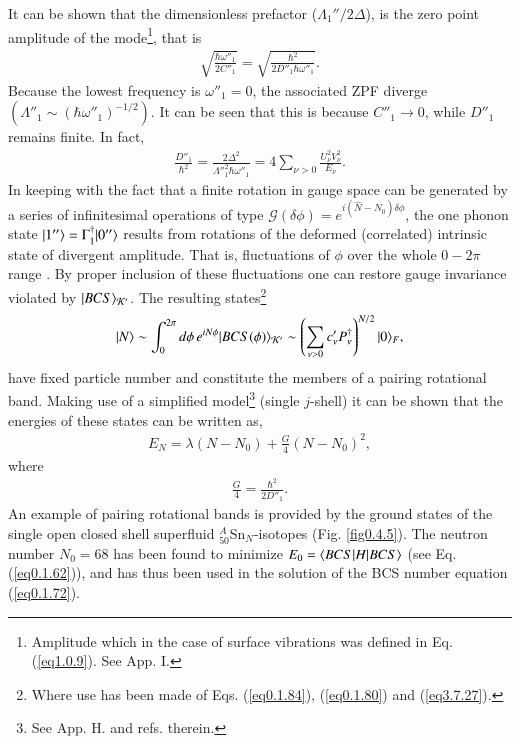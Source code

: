 It can be shown that the dimensionless prefactor ($\Lambda_1''/2\Delta$), is the zero point amplitude of the mode\footnote{Amplitude which in the case of surface vibrations was defined in Eq. (\ref{eq1.0.9}). See \cite{Brink:05} App. I.}, that is 
\begin{align}\label{eq0.1.99}
\sqrt{\frac{\hbar\omega''_1}{2C''_1}}=\sqrt{\frac{\hbar^2}{2D''_1\hbar\omega''_1}}.
\end{align}
Because the lowest frequency is $\omega''_1=0$, the associated ZPF diverge $(\Lambda''_1\sim(\hbar\omega''_1)^{-1/2})$. It can be seen that this is because $C''_1\to0$, while $D''_1$ remains finite. In fact,
\begin{align}\label{eq0.1.100}
\frac{D''_1}{\hbar^2}=\frac{2\Delta^2}{\Lambda''^2_1\hbar\omega''_1}=4\sum_{\nu>0}\frac{U^2_\nu V^2_\nu}{E_\nu}.
\end{align}
 In keeping with the fact that a finite rotation in gauge space can be generated by a series of infinitesimal operations of type $\mathcal G(\delta\phi)=e^{i(\hat N-N_0)\delta\phi}$, the one phonon state $|{1''} \rangle=\Gamma^\dagger_1|{0''} \rangle$ results from rotations of the deformed (correlated) intrinsic state of divergent amplitude. That is, fluctuations of $\phi$ over the whole $0-2\pi$ range 
 . By proper inclusion of these fluctuations one can restore gauge invariance   violated by $|{BCS} \rangle_{\mathcal K'}$. The resulting states\footnote{Where use has been made of Eqs. (\ref{eq0.1.84}), (\ref{eq0.1.80}) and (\ref{eq3.7.27}).}
\begin{align}\label{eq0.1.101}
\ket{N}\sim\int^{2\pi}_0d\phi\,e^{iN\phi}\ket{BCS(\phi)}_{\mathcal K'}\sim\left(\sum_{\nu>0}c'_\nu P^\dagger_\nu\right)^{N/2}\ket{0}_F, \idx{Gauge!--invariance restoration}
\end{align}
have  fixed  particle number and constitute the members of a pairing rotational band.  Making use of a simplified model\footnote{See \cite{Brink:05} App. H. and refs. therein.} (single $j$-shell) it can be shown that the energies of these states can be written as,
\begin{align}\label{eq0.1.102}
E_N=\lambda(N-N_0)+\frac{G}{4}\left(N-N_0\right)^2,
\end{align}
where 
\begin{align}\label{eq0.1.103}
\frac{G}{4}=\frac{\hbar^2}{2D''_1}.
\end{align}
An example of pairing rotational bands is provided by the ground states of the single open closed shell superfluid  $^A_{50}$Sn$_N$-isotopes (Fig. \ref{fig0.4.5}). The neutron number $N_0=68$ has been found to minimize $E_0=\langle {BCS|H|BCS} \rangle$ (see Eq. (\ref{eq0.1.62})), and  has thus been used in the solution of the BCS number equation (\ref{eq0.1.72}). 



